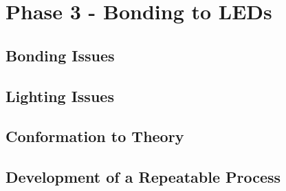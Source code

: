 \section{Phase 3 - Bonding to LEDs}

\subsection{Bonding Issues}
\subsection{Lighting Issues}
\subsection{Conformation to Theory}
\subsection{Development of a Repeatable Process}
